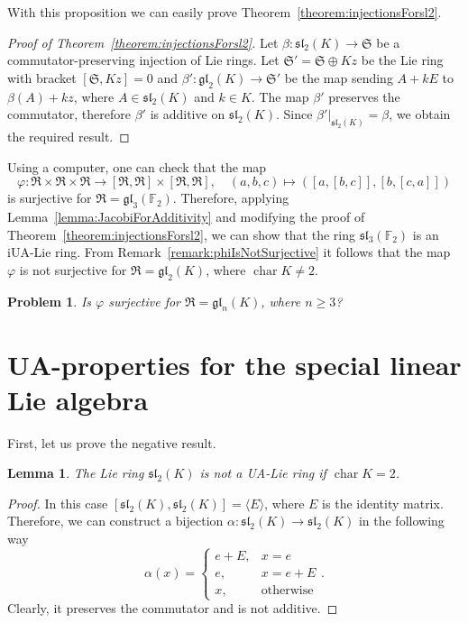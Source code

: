\documentclass[a4paper,reqno,12pt]{amsart}
\newtheorem{problem}[proposition]{Problem}
\newtheorem{lemma}[proposition]{Lemma}
\theoremstyle{definition}
\theoremstyle{remark}
\DeclareMathOperator{\Char}{char}
\def\FF{{\mathbb F}}
\def\RRR{\mathfrak{R}}
\def\SSS{\mathfrak{S}}
\def\gl{\mathfrak{gl}}
\def\sl{\mathfrak{sl}}
\renewcommand{\phi}{\varphi}
\renewcommand{\ge}{\geqslant}
\begin{document}
	With this proposition we can easily prove Theorem~\ref{theorem:injectionsForsl2}.

	\begin{proof}[Proof of Theorem~\ref{theorem:injectionsForsl2}]
		Let $\beta : \sl_2(K) \rightarrow \SSS$ be a commutator-preserving injection of Lie rings. Let $\SSS' = \SSS \oplus Kz$ be the Lie ring with bracket $[\SSS, Kz] = 0$ and $\beta' : \gl_2(K) \rightarrow \SSS'$ be the map sending $A + kE$ to $\beta(A) + kz$, where $A \in \sl_2(K)$ and $k \in K$. The map $\beta'$ preserves the commutator, therefore $\beta'$ is additive on $\sl_2(K)$. Since $\beta'|_{\sl_2(K)} = \beta$, we obtain the required result.
	\end{proof}

	Using a computer, one can check that the map
	\begin{equation*}
		\phi : \RRR \times \RRR \times \RRR \rightarrow [\RRR, \RRR] \times [\RRR, \RRR], \quad (a, b, c) \mapsto ([a, [b, c]], [b, [c, a]])
	\end{equation*}
	is surjective for $\RRR = \gl_3(\FF_2)$. Therefore, applying Lemma~\ref{lemma:JacobiForAdditivity} and modifying the proof of Theorem~\ref{theorem:injectionsForsl2}, we can show that the ring $\sl_3(\FF_2)$ is an iUA-Lie ring. From Remark~\ref{remark:phiIsNotSurjective} it follows that the map $\phi$ is not surjective for $\RRR = \gl_2(K)$, where $\Char K \neq 2$.

	\begin{problem}
		Is $\phi$ surjective for $\RRR = \gl_n(K)$, where $n \ge 3$?
	\end{problem}

	\section{UA-properties for the special linear Lie algebra}
	\label{sec5}

	First, let us prove the negative result.

	\begin{lemma}\label{lemma:whenSlIsNotUA}
		The Lie ring $\sl_2(K)$ is not a UA-Lie ring if $\Char K = 2$.
	\end{lemma}

	\begin{proof}
		In this case $[\sl_2(K), \sl_2(K)] = \langle E \rangle$, where $E$ is the identity matrix. Therefore, we can construct a bijection $\alpha : \sl_2(K) \rightarrow \sl_2(K)$ in the following way
		\begin{equation*}
			\alpha(x) = 
			\begin{cases}
				e + E, & x = e \\
				e, & x = e + E \\
				x, & \text{otherwise}
			\end{cases}.
		\end{equation*}
		Clearly, it preserves the commutator and is not additive.
	\end{proof}
\end{document}
